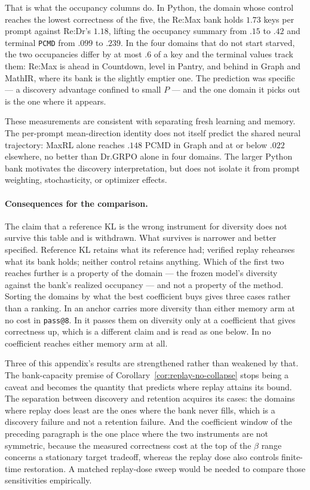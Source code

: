 \documentclass{article}
\newcommand{\1}{\mathbf 1}
\newcommand{\pmd}{\texttt{PCMD}}
\theoremstyle{remark}
\theoremstyle{definition}
\theoremstyle{plain}
\begin{document}
That is what the occupancy columns do. In Python, the domain whose control
reaches the lowest correctness of the five, the Re:Max bank holds $1.73$ keys
per prompt against Re:Dr's $1.18$, lifting the occupancy summary from $.15$ to
$.42$ and terminal \pmd{} from $.099$ to $.239$. In the four domains that do
not start starved, the two occupancies differ by at most $.6$ of a key and the
terminal values track them: Re:Max is ahead in Countdown, level in Pantry, and
behind in Graph and MathIR, where its bank is the slightly emptier one. The
prediction was specific --- a discovery advantage confined to small $P$ --- and
the one domain it picks out is the one where it appears.

These measurements are consistent with separating fresh learning and
memory. The per-prompt mean-direction identity does not itself predict the
shared neural trajectory: MaxRL alone reaches $.148$ PCMD in Graph and at
or below $.022$ elsewhere, no better than Dr.GRPO alone in four domains.
The larger Python bank motivates the discovery interpretation, but does not
isolate it from prompt weighting, stochasticity, or optimizer effects.

\paragraph{Consequences for the comparison.}
The claim that a reference KL is the wrong instrument for diversity does not
survive this table and is withdrawn. What survives is narrower and better
specified. Reference KL retains what its reference had; verified replay
rehearses what its bank holds; neither control retains anything. Which of the
first two reaches further is a property of the domain --- the frozen model's
diversity against the bank's realized occupancy --- and not a property of the
method. Sorting the domains by what the best coefficient buys gives three
cases rather than a ranking. In \MDklFreeNames{} an anchor carries more diversity than
either memory arm at no cost in \texttt{pass@8}. In \MDklPricedNames{} it
passes them on diversity only at a coefficient that gives correctness up, which
is a different claim and is read as one below. In \MDklMemoryNames{} no
coefficient reaches either memory arm at all.

Three of this appendix's results are strengthened rather than weakened by that.
The bank-capacity premise of Corollary~\ref{cor:replay-no-collapse} stops being
a caveat and becomes the quantity that predicts where replay attains its bound.
The separation between discovery and retention acquires its cases: the domains
where replay does least are the ones where the bank never fills, which is a
discovery failure and not a retention failure. And the coefficient window of
the preceding paragraph is the one place where the two instruments are not
symmetric, because the measured correctness cost at the top of the $\beta$
range concerns a stationary target tradeoff, whereas the replay dose also
controls finite-time restoration. A matched replay-dose sweep would be
needed to compare those sensitivities empirically.
\end{document}
